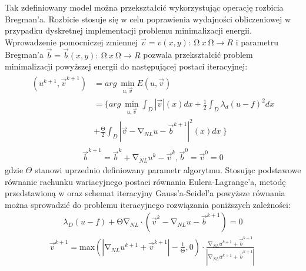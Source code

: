 \documentclass[12pt, twoside, openany]{report}
\theoremstyle{definition}
\begin{document}
Tak zdefiniowany model można przekształcić wykorzystując operację rozbicia Bregman’a. Rozbicie stosuje się w celu poprawienia wydajności obliczeniowej w przypadku dyskretnej implementacji problemu minimalizacji energii. Wprowadzenie pomocniczej zmiennej $\overrightarrow{v}=v\left(x,y\right):\ \mathrm{\Omega }\mathrm{\ }x\ \mathrm{\Omega }\longrightarrow R$ i parametru Bregman’a $\overrightarrow{b}=\overrightarrow{b}\left(x,y\right):\ \mathrm{\Omega }\mathrm{\ }x\ \mathrm{\Omega }\longrightarrow R$ pozwala przekształcić problem minimalizacji powyższej energii do następującej postaci iteracyjnej:
\begin{align}
\begin{aligned}
\left(u^{k+1},{\overrightarrow{v}}^{k+1}\right) &= arg\ \mathop{\mathrm{min}}_{u,\overrightarrow{v}} E\left(u,\overrightarrow{v}\right)\\ 
&= \biggl\{arg\ \mathop{\mathrm{min}}_{u,\overrightarrow{v}}
\int_D{|\overrightarrow{v}|\left(x\right)}dx+\frac{1}{2}\int_D{{\lambda }_d{\left(u-f\right)}^2}dx \\
&+  \frac{\mathrm{\Theta }}{2}\int_D{{\left|\overrightarrow{v}-{\mathrm{\nabla }}_{NL}u-{\overrightarrow{b}}^{k+1}\right|}^2(x)}dx\ \biggr\}
\end{aligned}
\label{NLTVGRAYMINPROB}
\end{align}
\begin{align}
{\overrightarrow{b}}^{k+1}={\overrightarrow{b}}^k+{\mathrm{\nabla }}_{NL}u^k-{\overrightarrow{v}}^k, {\overrightarrow{b}}^0={\overrightarrow{v}}^0=0
\label{BREGMANVARIABLE}
\end{align}
gdzie $\Theta$ stanowi uprzednio definiowany parametr algorytmu. Stosując podstawowe równanie rachunku wariacyjnego postaci równania Eulera-Lagrange’a, metodę przedstawioną w \cite{tai2011fast} oraz schemat iteracyjny Gauss’a-Seidel’a powyższe równania można sprowadzić do problemu iteracyjnego rozwiązania poniższych zależności:
\begin{align}
{\lambda }_D\left(u-f\right)+\mathrm{\Theta }{\mathrm{\nabla }}_{NL}\cdot \left({\overrightarrow{v}}^k-{\mathrm{\nabla }}_{NL}u-{\overrightarrow{b}}^{k+1}\right)=0
\label{ELNLTV1}
\end{align}
\begin{align}
{\overrightarrow{v}}^{k+1}\mathrm{=}{\mathrm{max} \left(\left|{\mathrm{\nabla }}_{NL}u^{k+1}+{\overrightarrow{v}}^{k+1}\right|-\frac{1}{\mathrm{\Theta }},0\right)\cdot\frac{{\mathrm{\nabla }}_{NL}u^{k+1}+{\overrightarrow{b}}^{k+1}}{\left|{\mathrm{\nabla }}_{NL}u^{k+1}+{\overrightarrow{b}}^{k+1}\right|}\ }
\label{ELNLTV2}
\end{align}
\end{document}
